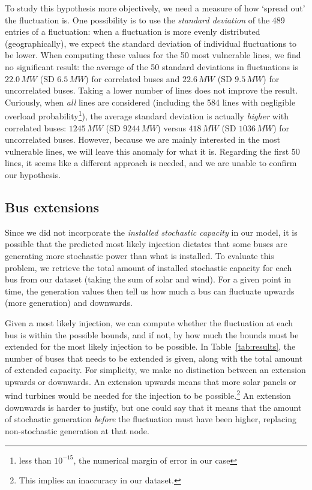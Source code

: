 \documentclass[main.tex]{subfiles}
\begin{document}
To study this hypothesis more objectively, we need a measure of how `spread out' the fluctuation is. One possibility is to use the \emph{standard deviation} of the 489 entries of a fluctuation: when a fluctuation is more evenly distributed (geographically), we expect the standard deviation of individual fluctuations to be lower. When computing these values for the 50 most vulnerable lines, we find no significant result: the average of the 50 standard deviations in fluctuations is $22.0\,\si{MW}$ (SD $6.5\,\si{MW}$) for correlated buses and $22.6\,\si{MW}$ (SD $9.5\,\si{MW}$) for uncorrelated buses. Taking a lower number of lines does not improve the result. Curiously, when \emph{all} lines are considered (including the 584 lines with negligible overload probability\footnote{\ie less than $10^{-15}$, the numerical margin of error in our case}), the average standard deviation is actually \emph{higher} with correlated buses: $1245\,\si{MW}$ (SD $9244\,\si{MW}$) versus $418\,\si{MW}$ (SD $1036\,\si{MW}$) for uncorrelated buses. However, because we are mainly interested in the most vulnerable lines, we will leave this anomaly for what it is. Regarding the first 50 lines, it seems like a different approach is needed, and we are unable to confirm our hypothesis.

\subsection{Bus extensions}
Since we did not incorporate the \emph{installed stochastic capacity} in our model, it is possible that the predicted most likely injection dictates that some buses are generating more stochastic power than what is installed. To evaluate this problem, we retrieve the total amount of installed stochastic capacity for each bus from our dataset (taking the sum of solar and wind). For a given point in time, the generation values then tell us how much a bus can fluctuate upwards (more generation) and downwards. 

Given a most likely injection, we can compute whether the fluctuation at each bus is within the possible bounds, and if not, by how much the bounds must be extended for the most likely injection to be possible. In Table~\ref{tab:results}, the number of buses that needs to be extended is given, along with the total amount of extended capacity. For simplicity, we make no distinction between an extension upwards or downwards. An extension upwards means that more solar panels or wind turbines would be needed for the injection to be possible.\footnote{This implies an inaccuracy in our dataset.} An extension downwards is harder to justify, but one could say that it means that the amount of stochastic generation \emph{before} the fluctuation must have been higher, replacing non-stochastic generation at that node.
\end{document}
